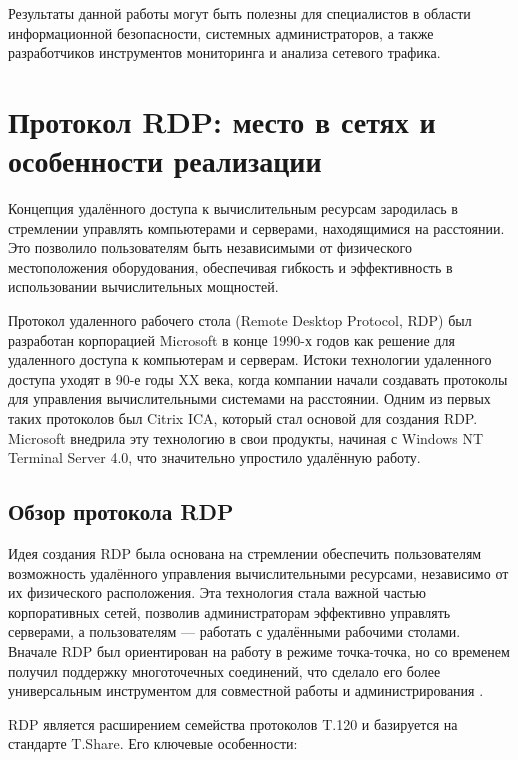 \documentclass[bachelor, och, coursework]{SCWorks}
\begin{document}
Результаты данной работы могут быть полезны для специалистов в области информационной безопасности, системных администраторов, а также 
разработчиков инструментов мониторинга и анализа сетевого трафика.

\section{Протокол RDP: место в сетях и особенности реализации}

Концепция удалённого доступа к вычислительным ресурсам зародилась в стремлении управлять компьютерами и серверами, находящимися на расстоянии. 
Это позволило пользователям быть независимыми от физического местоположения оборудования, обеспечивая гибкость и эффективность в использовании 
вычислительных мощностей.

Протокол удаленного рабочего стола (Remote Desktop Protocol, RDP) был разработан корпорацией Microsoft в конце 1990-х годов как решение для 
удаленного доступа к компьютерам и серверам. Истоки технологии удаленного доступа уходят в 90-е годы XX века, когда компании начали создавать 
протоколы для управления вычислительными системами на расстоянии. Одним из первых таких протоколов был Citrix ICA, который стал основой для 
создания RDP. Microsoft внедрила эту технологию в свои продукты, начиная с Windows NT Terminal Server 4.0, что значительно упростило удалённую работу.

\subsection{Обзор протокола RDP}

Идея создания RDP была основана на стремлении обеспечить пользователям возможность удалённого управления вычислительными ресурсами, независимо от 
их физического расположения. Эта технология стала важной частью корпоративных сетей, позволив администраторам эффективно управлять серверами, а 
пользователям --- работать с удалёнными рабочими столами. Вначале RDP был ориентирован на работу в режиме точка-точка, но со временем получил 
поддержку многоточечных соединений, что сделало его более универсальным инструментом для совместной работы и администрирования \cite{rdp2}.

RDP является расширением семейства протоколов T.120 и базируется на стандарте T.Share. Его ключевые особенности:
\end{document}

